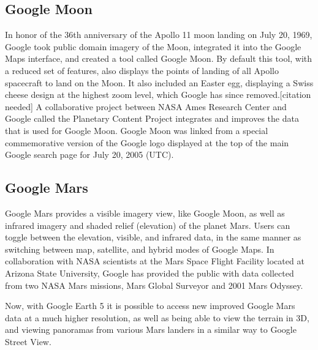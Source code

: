 \documentclass[a4paper,12pt]{article}
\begin{document}
\subsection {Google Moon}
\label{sec1}
In honor of the 36th anniversary of the Apollo 11 moon landing on July 20, 1969, Google took public domain imagery of the Moon, integrated it into the Google Maps interface, and created a tool called Google Moon.\cite{s6} By default this tool, with a reduced set of features, also displays the points of landing of all Apollo spacecraft to land on the Moon. It also included an Easter egg, displaying a Swiss cheese design at the highest zoom level, which Google has since removed.[citation needed] A collaborative project between NASA Ames Research Center and Google called the Planetary Content Project integrates and improves the data that is used for Google Moon.\cite{s7} Google Moon was linked from a special commemorative version of the Google logo displayed at the top of the main Google search page for July 20, 2005 (UTC).\cite{s8}

\subsection{Google Mars}
Google Mars provides a visible imagery view, like Google Moon, as well as infrared imagery and shaded relief (elevation) of the planet Mars. Users can toggle between the elevation, visible, and infrared data, in the same manner as switching between map, satellite, and hybrid modes of Google Maps. In collaboration with NASA scientists at the Mars Space Flight Facility located at Arizona State University, Google has provided the public with data collected from two NASA Mars missions, Mars Global Surveyor and 2001 Mars Odyssey.\cite{s9}

Now, with Google Earth 5 it is possible to access new improved Google Mars data at a much higher resolution, as well as being able to view the terrain in 3D, and viewing panoramas from various Mars landers in a similar way to Google Street View.






\end{document}
